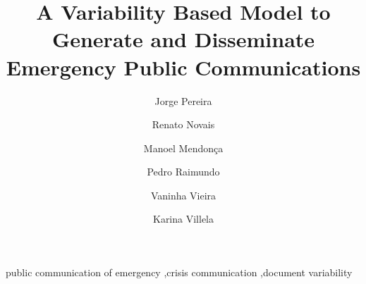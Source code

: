 \documentclass[final,3p,times,twocolumn]{elsarticle}
\begin{document}
\begin{frontmatter}

\title {A Variability Based Model to Generate and Disseminate \\ Emergency Public Communications}


\author[label1]{Jorge Pereira}
\address[label1]{Department of Computer Science, Federal University of Bahia (UFBA),  Brazil}




\author[label2,label3]{Renato Novais}
\address[label2]{Federal Institute of Bahia (IFBA),  Brazil}

\author[label1,label3]{Manoel Mendon\c{c}a}
\address[label3]{Fraunhofer Project Center at UFBA, Brazil}

\author[label1]{Pedro Raimundo}

\author[label1]{Vaninha Vieira}

\author[label4]{Karina Villela}
\address[label4]{Fraunhofer Institute for Experimental Software Engineering (IESE), Germany}



\begin{keyword}
public communication of emergency \sep crisis communication \sep document variability
\end{keyword}

\end{frontmatter}











\end{document}

